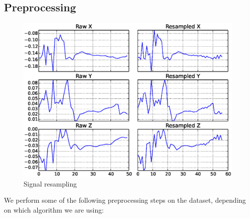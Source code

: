 \documentclass[twocolumn]{article}
\begin{document}
\subsection{Preprocessing}
\begin{figure}
\centering
\includegraphics[width=\linewidth]{results/resampled_signal}
\caption{Signal resampling}
\label{fig:resample}
\end{figure}
We perform some of the following preprocessing steps on the dataset, depending on which algorithm we are using:
\end{document}
